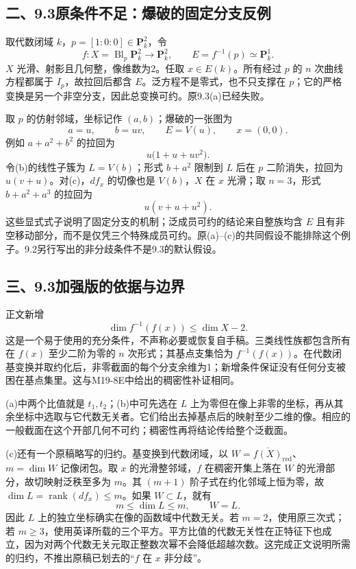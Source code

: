 \subsection*{二、9.3原条件不足：爆破的固定分支反例}
取代数闭域 $k$，$p=[1:0:0]\in\mathbf P^2_k$，令
\[
 f:X=\operatorname{Bl}_p\mathbf P^2_k\longrightarrow\mathbf P^2_k,
 \qquad E=f^{-1}(p)\simeq\mathbf P^1_k.
\]
$X$ 光滑、射影且几何整，像维数为2。任取 $x\in E(k)$。所有经过 $p$ 的 $n$ 次曲线方程都属于 $I_p$，故拉回后都含 $E$。泛方程不是零式，也不只支撑在 $p$；它的严格变换是另一个非空分支，因此总变换可约。原9.3(a)已经失败。

取 $p$ 的仿射邻域，坐标记作 $(a,b)$；爆破的一张图为
\[
 a=u,\qquad b=uv,\qquad E=V(u),\qquad x=(0,0).
\]
例如 $a+a^2+b^2$ 的拉回为
\[
 u\bigl(1+u+uv^2\bigr).
\]
令(b)的线性子簇为 $L=V(b)$；形式 $b+a^2$ 限制到 $L$ 后在 $p$ 二阶消失，拉回为 $u(v+u)$。对(c)，$df_x$ 的切像也是 $V(b)$，$X$ 在 $x$ 光滑；取 $n=3$，形式 $b+a^2+a^3$ 的拉回为
\[
 u(v+u+u^2).
\]
这些显式式子说明了固定分支的机制；泛成员可约的结论来自整族均含 $E$ 且有非空移动部分，而不是仅凭三个特殊成员可约。原(a)--(c)的共同假设不能排除这个例子。9.2另行写出的非分歧条件不是9.3的默认假设。

\subsection*{三、9.3加强版的依据与边界}
正文新增
\[
 \dim f^{-1}(f(x))\le\dim X-2.
\]
这是一个易于使用的充分条件，不声称必要或恢复自手稿。三类线性族都包含所有在 $f(x)$ 至少二阶为零的 $n$ 次形式；其基点支集恰为 $f^{-1}(f(x))$。在代数闭基变换并取约化后，非零截面的每个分支余维为1；新增条件保证没有任何分支被困在基点集里。这与M19-8E中给出的稠密性补证相同。

(a)中两个比值就是 $t_1,t_2$；(b)中可先选在 $L$ 上为零但在像上非零的坐标，再从其余坐标中选取与它代数无关者。它们给出去掉基点后的映射至少二维的像。相应的一般截面在这个开部几何不可约；稠密性再将结论传给整个泛截面。

(c)还有一个原稿略写的归约。基变换到代数闭域，以 $W=\overline{f(X)}_{\mathrm{red}}$、$m=\dim W$ 记像闭包。取 $x$ 的光滑整邻域，$f$ 在稠密开集上落在 $W$ 的光滑部分，故切映射泛秩至多为 $m$。其 $(m+1)$ 阶子式在约化邻域上恒为零，故 $\dim L=\operatorname{rank}(df_x)\le m$。如果 $W\subset L$，就有
\[
 m\le\dim L\le m,
 \qquad W=L.
\]
因此 $L$ 上的独立坐标确实在像的函数域中代数无关。若 $m=2$，使用原三次式；若 $m\ge3$，使用英译所载的三个平方。平方比值的代数无关性在正特征下也成立，因为对两个代数无关元取正整数次幂不会降低超越次数。这完成正文说明所需的归约，不推出原稿已划去的“$f$ 在 $x$ 非分歧”。

